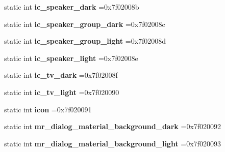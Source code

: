 \begin{DoxyCompactItemize}
static int {\bfseries ic\+\_\+speaker\+\_\+dark} =0x7f02008b
\item 
\mbox{\label{classandroid_1_1support_1_1design_1_1R_1_1drawable_a5139ececda584fba921f107567cd927d}} 
static int {\bfseries ic\+\_\+speaker\+\_\+group\+\_\+dark} =0x7f02008c
\item 
\mbox{\label{classandroid_1_1support_1_1design_1_1R_1_1drawable_a470130c144ea5d9aec33f8ed1a59bfed}} 
static int {\bfseries ic\+\_\+speaker\+\_\+group\+\_\+light} =0x7f02008d
\item 
\mbox{\label{classandroid_1_1support_1_1design_1_1R_1_1drawable_a5cfb9111fafd670288a2e85ad416585d}} 
static int {\bfseries ic\+\_\+speaker\+\_\+light} =0x7f02008e
\item 
\mbox{\label{classandroid_1_1support_1_1design_1_1R_1_1drawable_a5340216255bf1c993fb7480ee5f350fd}} 
static int {\bfseries ic\+\_\+tv\+\_\+dark} =0x7f02008f
\item 
\mbox{\label{classandroid_1_1support_1_1design_1_1R_1_1drawable_add5e689d48a367b58f62a9d997e53b63}} 
static int {\bfseries ic\+\_\+tv\+\_\+light} =0x7f020090
\item 
\mbox{\label{classandroid_1_1support_1_1design_1_1R_1_1drawable_a032f7893707ac42eb0db2f35921c0aa4}} 
static int {\bfseries icon} =0x7f020091
\item 
\mbox{\label{classandroid_1_1support_1_1design_1_1R_1_1drawable_a5afef257246f589ec04d7b13bff5c2ef}} 
static int {\bfseries mr\+\_\+dialog\+\_\+material\+\_\+background\+\_\+dark} =0x7f020092
\item 
\mbox{\label{classandroid_1_1support_1_1design_1_1R_1_1drawable_adea2aff1bbb8996b15e767234693f01d}} 
static int {\bfseries mr\+\_\+dialog\+\_\+material\+\_\+background\+\_\+light} =0x7f020093
\item 

\end{DoxyCompactItemize}
